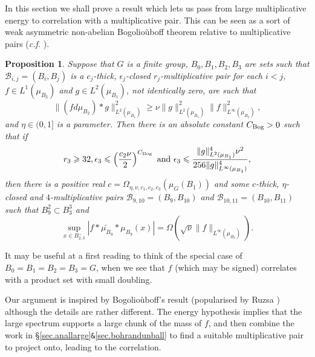 \documentclass[12pt]{amsart}
\numberwithin{equation}{section}
\theoremstyle{plain}
\newtheorem{proposition}[subsection]{Proposition}
\theoremstyle{definition}
\renewcommand{\leq}{\leqslant}
\renewcommand{\geq}{\geqslant}
\begin{document}
In this section we shall prove a result which lets us pass from large multiplicative energy to correlation with a multiplicative pair.  This can be seen as a sort of weak asymmetric non-abelian Bogolio{\`u}boff theorem relative to multiplicative pairs (\emph{c.f.} \cite{NNB}).  
\begin{proposition}\label{prop.mpls}
Suppose that $G$ is a finite group, $B_0,B_1,B_2,B_3$ are sets such that $\mathcal{B}_{i,j}=(B_i,B_j)$ is a $c_j$-thick, $\epsilon_j$-closed $r_j$-multiplicative pair for each $i<j$, $f \in L^1(\mu_{B_2})$ and $g \in L^2(\mu_{B_1})$, not identically zero, are such that
\begin{equation*}
\|(fd\mu_{B_2})\ast g\|_{L^2(\mu_{B_1})}^2 \geq \nu \|g\|_{L^2(\mu_{B_1})}^2\|f\|_{L^\infty(\mu_{B_2})}^2,
\end{equation*}
and $\eta \in (0,1]$ is a parameter. Then there is an absolute constant $C_{\rm{Bog}}>0$ such that if 
\begin{equation*}
r_3 \geq 32, \epsilon_3 \leq \left(\frac{c_2\nu}{2}\right)^{C_{\rm{Bog}}} \textrm{ and } \epsilon_3 \leq \frac{\|g\|_{L^2(\mu_{B_1})}^4\nu^2}{256\|g\|_{L^\infty(\mu_{B_1})}^4},
\end{equation*}
then there is a positive real $c=\Omega_{\eta,\nu,c_1,c_2,c_3}(\mu_G(B_1))$ and some $c$-thick, $\eta$-closed and $4$-multiplicative pairs $\mathcal{B}_{9,10}=(B_9,B_{10})$ and $\mathcal{B}_{10,11}=(B_{10},B_{11})$ such that $B_9^2 \subset B_3^3$ and 
\begin{equation*}
\sup_{x \in B_{2,3}^-}{|f \ast \widetilde{\mu_{B_9}}\ast \mu_{B_9}(x)|} =\Omega(\sqrt{\nu}\|f\|_{L^\infty(\mu_{B_2})}).
\end{equation*}
\end{proposition}
It may be useful at a first reading to think of the special case of $B_0=B_1=B_2=B_3=G$, when we see that $f$ (which may be signed) correlates with a product set with small doubling. 

Our argument is inspired by Bogolio{\`u}boff's result (popularised by Ruzsa \cite{IZRF}) although the details are rather different.  The energy hypothesis implies that the large spectrum supports a large chunk of the mass of $f$, and then combine the work in \S\ref{sec.anallarge}\verb!&!\ref{sec.bohrandunball} to find a suitable multiplicative pair to project onto, leading to the correlation.
\end{document}
